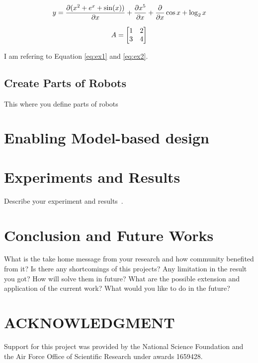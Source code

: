 \documentclass[letterpaper, 10 pt, conference]{ieeeconf}  %
\begin{document}

\begin{equation}
\label{eq:ex1}
	\begin{split}
	y = \pdv{(x^2 + e^x + \sin(x))}{x} + \pdv{x^5}{x} + \pdv{}{x}\cos x  + \log_2 x 
	\end{split}
\end{equation}

\begin{equation}
\label{eq:ex2}
A = \begin{bmatrix}1 & 2 \\ 3 & 4\end{bmatrix}
\end{equation}

I am refering to Equation \eqref{eq:ex1} and \eqref{eq:ex2}.




\subsection{Create Parts of Robots}
\label{sec:parts}
This where you define parts of robots

\section{Enabling Model-based design}
\label{sec:enablebd}



\section{Experiments and Results}
\label{sec:experiments}

Describe your experiment and results~\cite{bhadani2018cat}.

    
   
\section{Conclusion and Future Works}
\label{sec:conclusion}
What is the take home message from your research and how community benefited from it? Is there any shortcomings of this projects? Any limitation in the result you got? 
How will solve them in future? What are the possible extension and application of the current work? What would you like to do in the future?


\section*{ACKNOWLEDGMENT}
Support for this project was provided by the National Science Foundation and the Air Force Office of Scientific Research under awards 1659428.




\end{document}
